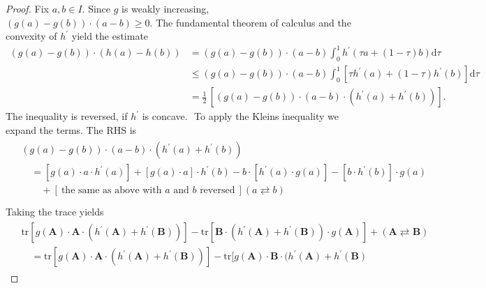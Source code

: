 \begin{proof}
  \emph{\cite[Lemma~3.4]{Mackey2014}}
  Fix 
  $
    a,b
    \in
    I
.
  $
  Since 
  $g$
  is
  weakly increasing,
  $
  (
    g(a) - g(b)
  )
  \cdot
  (a-b)
  \ge 0.
  $
  The 
  fundamental theorem of calculus and the convexity of 
  $h^{'}$
  yield the estimate
  \begin{align}
  (
    g(a) - g(b)
  )
  \cdot
  (
    h(a) - h(b)
  )
  &=
  (
    g(a) - g(b)
  )
  \cdot
  (a-b)
  \int_0^1
  h^{'}
  (
    \tau a + (1-\tau) b
  )
  \mathrm{d}\tau
  \\
  &\le
  (
    g(a) - g(b)
  )
  \cdot
  (a-b)
  \int_0^1
  [
  \tau
  h^{'}
  (
     a 
  )
  +
  (1-\tau)
  h^{'}
  (
     b 
  )
  ]
  \mathrm{d}\tau
  \\
  &=
  \frac{1}{2}
  \,
  [
  (
    g(a) - g(b)
  )
  \cdot
  (a-b)
  \cdot  
  (
    h^{'}
    (a)
    +
    h^{'}
    (b)
  )
  ]
  .
  \end{align}
  The inequality is reversed, if $h^{'}$ is concave.
  $
  $
  To apply the Kleins inequality we expand the terms.
  The RHS is
  \begin{align}
    \begin{split}
  &(
    g(a) - g(b)
  )
  \cdot
  (a-b)
  \cdot  
  (
    h^{'}
    (a)
    +
    h^{'}
    (b)
  )
  \\
  &\quad=
  [
g(a)\cdot a \cdot h^{'}(a)
  ]
    +
    [g(a)\cdot a] \cdot h^{'}(b)
  -
  b \cdot[h^{'}(a)\cdot g(a)]
  -
  [b \cdot h^{'}(b)]\cdot g(a)
  \\
  &\qquad
  +
    [
\ \text{the same as above with $a$ and $b$ reversed}\ 
  ]
  (a \rightleftarrows b)
  \\
  \end{split}
  \end{align}
  Taking the trace yields
  \begin{align}
    \begin{split}
&
\mathrm{tr}
  [
    g(\mathbf{A})
    \cdot
    \mathbf{A}
    \cdot
    (
    h^{'}(\mathbf{A})
    +
    h^{'}(\mathbf{B})
    )
  ]
  -
  \mathrm{tr}
  [
    \mathbf{B}
    \cdot
    (
    h^{'}(\mathbf{A})
    +
    h^{'}(\mathbf{B})
    )
    \cdot
    g(\mathbf{A})
  ]
  +
  (\mathbf{A} \rightleftarrows \mathbf{B})
  \\
  &\quad=
\mathrm{tr}
  [
    g(\mathbf{A})
    \cdot
    \mathbf{A}
    \cdot
    (
    h^{'}(\mathbf{A})
    +
    h^{'}(\mathbf{B})
    )
  ]
  -
  \mathrm{tr}
  [
    g(\mathbf{A})
    \cdot
    \mathbf{B}
    \cdot
    (
    h^{'}(\mathbf{A})
    +
    h^{'}(\mathbf{B})

\end{split}
\end{align}
\end{proof}
